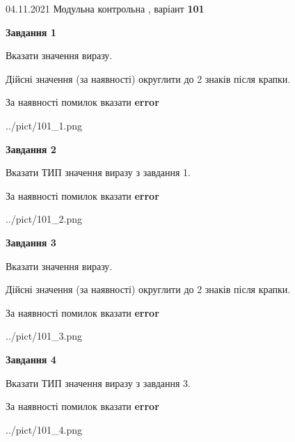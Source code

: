 \documentclass[11pt, ukrainian]{article}
\begin{document}
{04.11.2021 Модульна контрольна , варіант  \No \textbf { 101 }\par}
{
\begin {large}
{\begin {center}\textbf{Завдання 1}\end {center}}\par
Вказати значення виразу. \par
Дійсні значення (за наявності) округлити до 2 знаків після крапки. \par
За наявності помилок вказати \textbf{error}

\begin{center}
	{../pict/101_1.png}
\end{center}
\newpage

{\begin {center}\textbf{Завдання 2}\end {center}}\par
Вказати ТИП значення виразу з завдання 1. \par
За наявності помилок вказати \textbf{error}

\begin{center}
	{../pict/101_2.png}
\end{center}
\newpage

{\begin {center}\textbf{Завдання 3}\end {center}}\par
Вказати значення виразу. \par
Дійсні значення (за наявності) округлити до 2 знаків після крапки. \par
За наявності помилок вказати \textbf{error}

\begin{center}
	{../pict/101_3.png}
\end{center}
\newpage

{\begin {center}\textbf{Завдання 4}\end {center}}\par
Вказати ТИП значення виразу з завдання 3. \par
За наявності помилок вказати \textbf{error}

\begin{center}
	{../pict/101_4.png}
\end{center}
\newpage


\end{large}}
\end{document}
